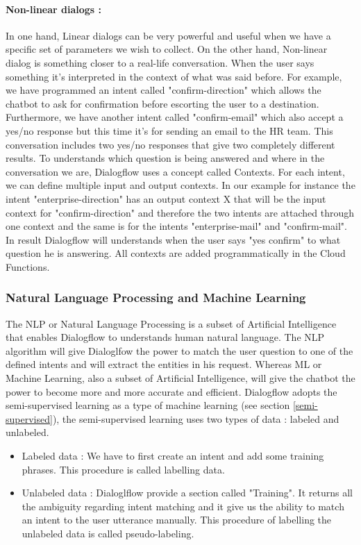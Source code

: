 \paragraph{\textbf{Non-linear dialogs :}} In one hand, Linear dialogs can be very powerful and useful when we have a specific set of parameters we wish to collect. On the other hand, Non-linear dialog is something closer to a real-life conversation. When the user says something it's interpreted in the context of what was said before. For example, we have programmed an intent called "confirm-direction" which allows the chatbot to ask for confirmation before escorting the user to a destination. Furthermore, we have another intent called "confirm-email" which also accept a yes/no response but this time it's for sending an email to the HR team. This conversation includes two yes/no responses that give two completely different results. To understands which question is being answered and where in the conversation we are, Dialogflow uses a concept called Contexts. For each intent, we can define multiple input and output contexts. In our example for instance the intent "enterprise-direction" has an output context X that will be the input context for "confirm-direction" and therefore the two intents are attached through one context and the same is for the intents "enterprise-mail" and "confirm-mail". In result Dialogflow will understands when the user says "yes confirm" to what question he is answering. All contexts are added programmatically in the Cloud Functions.
\subsubsection{Natural Language Processing and Machine Learning}
The NLP or Natural Language Processing is a subset of Artificial Intelligence that enables Dialogflow to understands human natural language. The NLP algorithm will give Dialoglfow the power to match the user question to one of the defined intents and will extract the entities in his request. Whereas ML or Machine Learning, also a subset of Artificial Intelligence, will give the chatbot the power to become more and more accurate and efficient. Dialogflow adopts the semi-supervised learning as a type of machine learning (see section \ref{semi-supervised}), the semi-supervised learning uses two types of data : labeled and unlabeled. 
\begin{itemize}
    \item Labeled data : We have to first create an intent and add some training phrases. This procedure is called labelling data.
    \item Unlabeled data : Dialoglflow provide a section called "Training". It returns all the ambiguity regarding intent matching and it give us the ability to match an intent to the user utterance manually. This procedure of labelling the unlabeled data is called pseudo-labeling.
\end{itemize} 
